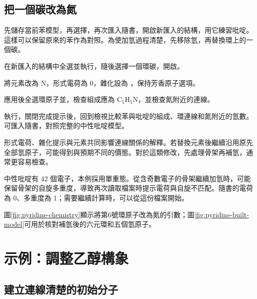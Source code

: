 \subsection{把一個碳改為氮}

先儲存當前苯模型，再選擇，再次匯入隨書，開啟新匯入的結構，用它練習吡啶。這樣可以保留原來的苯作為對照。為使加氫過程清楚，先移除氫，再替換環上的一個碳。

\begin{steps}
  \item 在新匯入的結構中全選並執行，隨後選擇一個環碳，開啟。
  \item 將元素改為 N，形式電荷為 0，雜化設為 ，保持芳香原子選項。
\end{steps}



\begin{steps}[resume]
  \item 應用後全選環原子並，檢查組成應為 $\mathrm{C_5H_5N}$，並檢查氮附近的連線。
  \item 執行，關閉完成提示後，回到檢視比較苯與吡啶的組成、環連線和氮附近的氫數。可匯入隨書，對照完整的中性吡啶模型。
\end{steps}

形式電荷、雜化提示與元素共同影響連線關係的解釋。若替換元素後繼續沿用原先全部氫原子，可能得到與預期不同的價態。對於這類修改，先處理骨架再補氫，通常更容易檢查。

中性吡啶有 42 個電子，本例採用單重態。從含奇數電子的骨架繼續加氫時，可能保留骨架的自旋多重度，導致再次讀取檔案時提示電荷與自旋不匹配。隨書的電荷為 0、多重度為 1；需要繼續計算時，可以從這份檔案開始。

圖\ref{fig:pyridine-chemistry}顯示將第6號環原子改為氮的引數；圖\ref{fig:pyridine-built-model}可用於核對補氫後的六元環和五個氫原子。



\section{示例：調整乙醇構象}

\subsection{建立連線清楚的初始分子}

